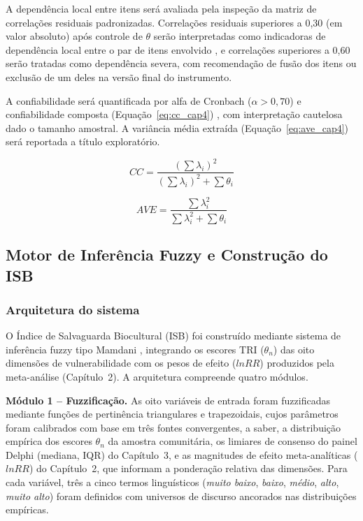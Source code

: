 A dependência local entre itens será avaliada pela inspeção da matriz de correlações residuais padronizadas. Correlações residuais superiores a 0,30 (em valor absoluto) após controle de $\theta$ serão interpretadas como indicadoras de dependência local entre o par de itens envolvido \cite{Christensen2017}, e correlações superiores a 0,60 serão tratadas como dependência severa, com recomendação de fusão dos itens ou exclusão de um deles na versão final do instrumento.

A confiabilidade será quantificada por alfa de Cronbach ($\alpha > 0{,}70$) \cite{Cronbach1951} e confiabilidade composta (Equação~\ref{eq:cc_cap4}) \cite{Fornell1981}, com interpretação cautelosa dado o tamanho amostral. A variância média extraída (Equação~\ref{eq:ave_cap4}) será reportada a título exploratório.

\begin{equation}
CC = \frac{(\sum\lambda_i)^2}{(\sum\lambda_i)^2 + \sum\theta_i}
\label{eq:cc_cap4}
\end{equation}

\begin{equation}
AVE = \frac{\sum\lambda_i^2}{\sum\lambda_i^2 + \sum\theta_i}
\label{eq:ave_cap4}
\end{equation}


\subsection{Motor de Inferência Fuzzy e Construção do ISB}

\subsubsection{Arquitetura do sistema}

O Índice de Salvaguarda Biocultural (ISB) foi construído mediante sistema de inferência fuzzy tipo Mamdani \cite{Mamdani1975}, integrando os escores TRI ($\theta_n$) das oito dimensões de vulnerabilidade com os pesos de efeito ($lnRR$) produzidos pela meta-análise (Capítulo~2). A arquitetura compreende quatro módulos.

\textbf{Módulo 1 -- Fuzzificação.} As oito variáveis de entrada foram fuzzificadas mediante funções de pertinência triangulares e trapezoidais, cujos parâmetros foram calibrados com base em três fontes convergentes, a saber, a distribuição empírica dos escores $\theta_n$ da amostra comunitária, os limiares de consenso do painel Delphi (mediana, IQR) do Capítulo~3, e as magnitudes de efeito meta-analíticas ($lnRR$) do Capítulo~2, que informam a ponderação relativa das dimensões. Para cada variável, três a cinco termos linguísticos (\textit{muito baixo}, \textit{baixo}, \textit{médio}, \textit{alto}, \textit{muito alto}) foram definidos com universos de discurso ancorados nas distribuições empíricas.

